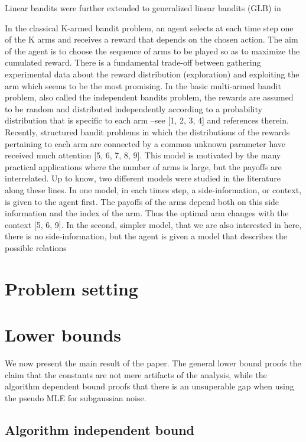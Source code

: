 \documentclass[twoside]{article} \usepackage{aistats2017}
\begin{document}
Linear bandits were further extended to generalized linear bandits (GLB) in 
 
In the classical K-armed bandit problem, an agent selects at each time step one of the K arms and
receives a reward that depends on the chosen action. The aim of the agent is to choose the sequence
of arms to be played so as to maximize the cumulated reward. There is a fundamental trade-off
between gathering experimental data about the reward distribution (exploration) and exploiting the
arm which seems to be the most promising.
In the basic multi-armed bandit problem, also called the independent bandits problem, the
rewards are assumed to be random and distributed independently according to a probability
distribution that is specific to each arm –see [1, 2, 3, 4] and references therein. Recently, structured
bandit problems in which the distributions of the rewards pertaining to each arm are connected
by a common unknown parameter have received much attention [5, 6, 7, 8, 9]. This model is
motivated by the many practical applications where the number of arms is large, but the payoffs are
interrelated. Up to know, two different models were studied in the literature along these lines. In
one model, in each times step, a side-information, or context, is given to the agent first. The payoffs
of the arms depend both on this side information and the index of the arm. Thus the optimal arm
changes with the context [5, 6, 9]. In the second, simpler model, that we are also interested in here,
there is no side-information, but the agent is given a model that describes the possible relations
\section{Problem setting}

\section{Lower bounds}

We now present the main result of the paper. The general lower bound proofs the claim that the constants are not mere artifacts of the analysis, while the algorithm dependent bound proofs that there is an unsuperable gap when using the pseudo MLE for subgaussian noise.

\subsection{Algorithm independent bound}
\end{document}
